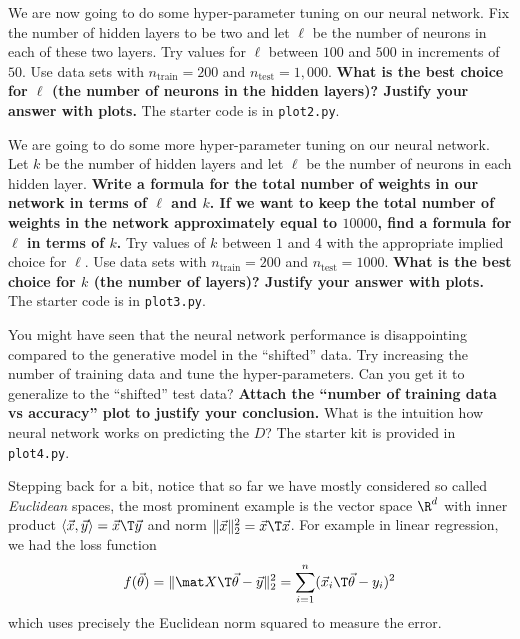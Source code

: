 \documentclass[preview]{standalone}
\begin{document}
\begin{Parts}
\Part We are now going to do some hyper-parameter tuning on our neural network.
Fix the number of hidden layers to be two and let $\ell$ be the number of
neurons in each of these two layers. Try values for $\ell$ between $100$ and
$500$ in increments of $50$. Use data sets with $n_\text{train} = 200$ and
$n_\text{test}=1,000$. \textbf{What is the best choice for $\ell$ (the number
of neurons in the hidden layers)? Justify your answer with plots.}  The starter
code is in \texttt{plot2.py}.



\Part We are going to do some more hyper-parameter tuning on our neural
network. Let $k$ be the number of hidden layers and let $\ell$ be the number of
neurons in each hidden layer. \textbf{Write a formula for the total number of
weights in our network in terms of $\ell$ and $k$. If we want to keep the total
number of weights in the network approximately equal to $10000$, find a formula
for $\ell$ in terms of $k$.} Try values of $k$ between $1$ and $4$ with the
appropriate implied choice for $\ell$. Use data sets with $n_\text{train}=200$
and $n_\text{test}=1000$. \textbf{What is the best choice for $k$ (the number
of layers)? Justify your answer with plots.}  The starter code is in
\texttt{plot3.py}.





\Part You might have seen that the neural network performance is disappointing
compared to the generative model in the ``shifted'' data.  Try increasing the
number of training data and tune the hyper-parameters.  Can you get it to
generalize to the ``shifted'' test data?  \textbf{Attach the ``number of
training data vs accuracy'' plot to justify your conclusion.} What is the
intuition how neural network works on predicting the $D$? The starter kit is
provided in \texttt{plot4.py}.



\end{Parts}

\newcommand{\pcmKL}{\operatorname{KL}}


Stepping back for a bit, notice that so far we have mostly considered so called \emph{Euclidean} spaces, the
most prominent example is the vector space $\R^d$ with
inner product $\langle \vec x, \vec y\rangle = \vec x\T \vec y$ and norm $\lVert \vec x \rVert_2^2 = \vec x\T \vec x$.
For example in linear regression, we had the loss function
\begin{equation*}
f(\vec \theta) = \lVert \mat X\T \vec \theta - \vec y\rVert_2^2 = \sum_{i=1}^n (\vec x_i\T\vec\theta - y_i)^2
\end{equation*}
which uses precisely the Euclidean norm squared to measure the error.
\end{document}
